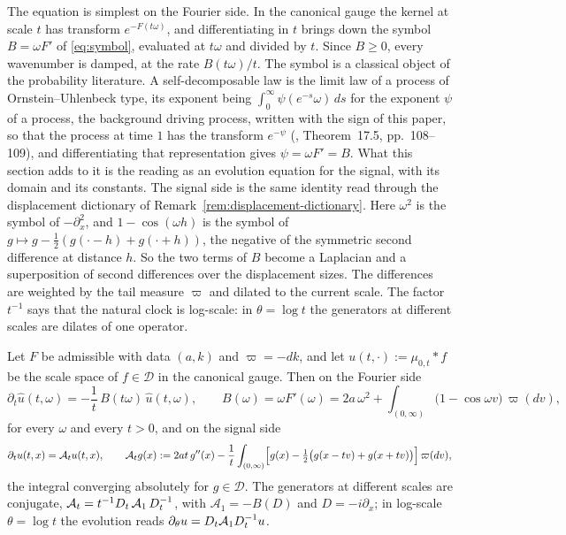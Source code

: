 The equation is simplest on the Fourier side. In the canonical gauge the kernel at scale $t$
has transform $e^{-F(t\omega)}$, and differentiating in $t$ brings down the symbol
$B = \omega F'$ of \ref{eq:symbol}, evaluated at $t\omega$ and divided by $t$. Since
$B \ge 0$, every wavenumber is damped, at the rate $B(t\omega)/t$. The symbol is a classical
object of the probability literature. A self-decomposable law is the limit law of a process of
Ornstein--Uhlenbeck type, its exponent being $\int_0^\infty \psi(e^{-s}\omega)\,ds$ for the
exponent $\psi$ of a \Levy{} process, the background driving process, written with the sign of
this paper, so that the process at time $1$ has the transform $e^{-\psi}$
(, Theorem~17.5, pp.~108--109), and differentiating that representation
gives $\psi = \omega F' = B$. What this section adds to it is the reading as an evolution
equation for the signal, with its domain and its constants. The signal side is the same
identity read through the displacement dictionary of
Remark~\ref{rem:displacement-dictionary}. Here $\omega^2$ is the symbol of $-\partial_x^2$, and
$1 - \cos(\omega h)$ is the symbol of $g \mapsto g - \tfrac12(g(\cdot - h) + g(\cdot + h))$,
the negative of the symmetric second difference at distance $h$. So the two terms of $B$
become a Laplacian and a superposition of second differences over the displacement sizes. The
differences are weighted by the tail measure $\varpi$ and dilated to the current scale.
The factor $t^{-1}$ says that the natural clock is log-scale: in $\theta = \log t$ the
generators at different scales are dilates of one operator.



\begin{proposition}\label{prop:scale-evolution}
Let $F$ be admissible with data $(a,k)$ and $\varpi = -dk$, and let $u(t,\cdot) :=
\mu_{0,t} * f$ be the scale space of $f \in \mathcal{D}$ in the canonical gauge. Then on the
Fourier side
\begin{equation}\label{eq:evolution-fourier}
  \partial_t\hat u(t,\omega) = -\frac1t\,B(t\omega)\,\hat u(t,\omega),
  \qquad
  B(\omega) = \omega F'(\omega)
   = 2a\,\omega^2 + \int_{(0,\infty)}\bigl(1 - \cos\omega v\bigr)\,\varpi(dv),
\end{equation}
for every $\omega$ and every $t > 0$, and on the signal side
\begin{equation}\label{eq:evolution-signal}
  \partial_t u(t,x) = \mathcal{A}_t u(t,x),
  \qquad
  \mathcal{A}_t g(x) := 2at\,g''(x)
   - \frac1t\int_{(0,\infty)}\Bigl[g(x) - \tfrac12\bigl(g(x-tv) + g(x+tv)\bigr)\Bigr]\,\varpi(dv),
\end{equation}
the integral converging absolutely for $g \in \mathcal{D}$. The generators at different scales
are conjugate, $\mathcal{A}_t = t^{-1}D_{t}\,\mathcal{A}_1\,D_{t}^{-1}$, with
$\mathcal{A}_1 = -B(D)$ and $D = -i\partial_x$; in log-scale $\theta = \log t$ the
evolution reads $\partial_\theta u = D_{t}\mathcal{A}_1D_{t}^{-1}u$.
\end{proposition}

